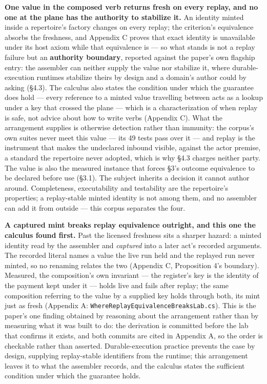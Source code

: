 \documentclass[
]{article}
\begin{document}
\textbf{One value in the composed verb returns fresh on every replay,
and no one at the plane has the authority to stabilize it.} An identity
minted inside a repertoire's factory changes on every replay; the
criterion's equivalence absorbs the freshness, and Appendix C proves
that exact identity is unavailable under its host axiom while that
equivalence is --- so what stands is not a replay failure but an
\textbf{authority boundary}, reported against the paper's own flagship
entry: the assembler can neither supply the value nor stabilize it,
where durable-execution runtimes stabilize theirs by design and a
domain's author could by asking (§4.3). The calculus also states the
condition under which the guarantee does hold --- every reference to a
minted value travelling between acts as a lookup under a key that
crossed the plane --- which is a characterization of when replay is
safe, not advice about how to write verbs (Appendix C). What the
arrangement supplies is otherwise detection rather than immunity: the
corpus's own suites never meet this value --- its 49 tests pass over it
--- and replay is the instrument that makes the undeclared inbound
visible, against the actor premise, a standard the repertoire never
adopted, which is why §4.3 charges neither party. The value is also the
measured instance that forces §3's outcome equivalence to be declared
before use (§3.1). The subject inherits a decision it cannot author
around. Completeness, executability and testability are the repertoire's
properties; a replay-stable minted identity is not among them, and no
assembler can add it from outside --- this corpus separates the four.

\textbf{A captured mint breaks replay equivalence outright, and this one
the calculus found first.} Past the licensed freshness sits a sharper
hazard: a minted identity read by the assembler and \emph{captured} into
a later act's recorded arguments. The recorded literal names a value the
live run held and the replayed run never minted, so no renaming relates
the two (Appendix C, Proposition 4's boundary). Measured, the
composition's own invariant --- the register's key is the identity of
the payment kept under it --- holds live and fails after replay; the
same composition referring to the value by a supplied key holds through
both, its mint just as fresh (Appendix A:
\texttt{WhereReplayEquivalenceBreaksLab.cs}). This is the paper's one
finding obtained by reasoning about the arrangement rather than by
measuring what it was built to do: the derivation is committed before
the lab that confirms it exists, and both commits are cited in Appendix
A, so the order is checkable rather than asserted. Durable-execution
practice prevents the case by design, supplying replay-stable
identifiers from the runtime; this arrangement leaves it to what the
assembler records, and the calculus states the sufficient condition
under which the guarantee holds.
\end{document}
